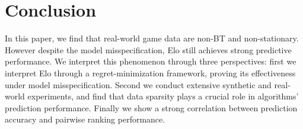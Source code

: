 \section{Conclusion}
\label{sec:conclusion}



In this paper, we find that real-world game data are non-BT and non-stationary. However despite the model misspecification, Elo still achieves strong predictive performance. We interpret this phenomenon through three perspectives:
first we interpret Elo through a regret-minimization framework, proving its effectiveness under model misspecification. Second we conduct extensive synthetic and real-world experiments, and find that data sparsity plays a crucial role in algorithms' prediction performance. Finally we show a strong correlation between prediction accuracy and pairwise ranking performance.